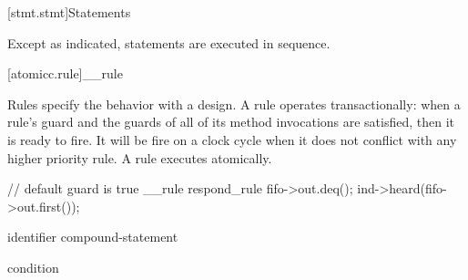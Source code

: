 [stmt.stmt]{Statements}%


\pnum
Except as indicated, statements are executed in sequence.

[atomicc.rule]{__rule}

Rules specify the behavior with a design. A rule operates
transactionally: when a rule's guard and the guards of all of its
method invocations are satisfied, then it is ready to fire. It will be
fire on a clock cycle when it does not conflict with any higher
priority rule. A rule executes atomically.

\begin{codeblock}
     // default guard is true
     __rule respond_rule {
         fifo->out.deq();
         ind->heard(fifo->out.first());
     }
\end{codeblock}

\begin{bnf}
\br
     identifier  compound-statement\br

\br
     condition \terminal{)}

\end{bnf}
